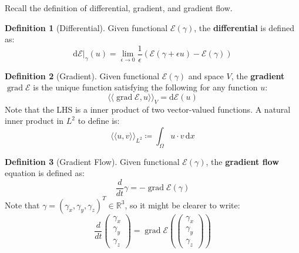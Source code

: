 \documentclass[a4paper, 11pt]{article}
\newcommand{\dx}{\,\text{d}x}
\newcommand{\inner}[1]{\langle \langle #1 \rangle \rangle}
\DeclareMathOperator{\grad}{grad}
\theoremstyle{definition}
\newtheorem{definition}{Definition}
\begin{document}
Recall the definition of differential, gradient, and gradient flow.
\begin{definition}[Differential]
    Given functional $\mathcal{E}(\gamma)$, the \textbf{differential} is defined as:
    \begin{equation}
        \text{d}\mathcal{E}|_{\gamma} (u) = \lim_{\epsilon \rightarrow 0} \frac{1}{\epsilon} \left( \mathcal{E}\left( \gamma + \epsilon u \right) - \mathcal{E}\left( \gamma \right) \right)
    \end{equation}
\end{definition}

\begin{definition}[Gradient]
    Given functional $\mathcal{E}\left( \gamma \right)$ and space $V$, the \textbf{gradient} $\grad \mathcal{E}$ is the unique function satisfying the following for any function $u$:
    \begin{equation}
        \inner{\grad \mathcal{E}, u}_V = \text{d} \mathcal{E} (u)
    \end{equation}
    Note that the LHS is a inner product of two vector-valued functions.
    A natural inner product in $L^2$ to define is:
    \begin{equation}
        \inner{u,v}_{L^2} \coloneqq \int_{\Omega} u \cdot v \dx
    \end{equation}

\end{definition}

\begin{definition}[Gradient Flow]
    Given functional $\mathcal{E}(\gamma)$, the \textbf{gradient flow} equation is defined as:
    \begin{equation}
        \frac{d}{dt} \gamma = - \grad \mathcal{E} (\gamma)
    \end{equation}
    Note that $\gamma = \left( \gamma_x, \gamma_y, \gamma_z \right)^T \in \mathbb{R}^3$, so it might be clearer to write:
    \begin{equation}
        \frac{d}{dt}
        \begin{pmatrix}
            \gamma_x \\
            \gamma_y \\
            \gamma_z
        \end{pmatrix}
        =
        \grad \mathcal{E} \left( 
            \begin{pmatrix}
                \gamma_x \\
                \gamma_y \\
                \gamma_z
            \end{pmatrix}
        \right)
    \end{equation}
\end{definition}
\end{document}
